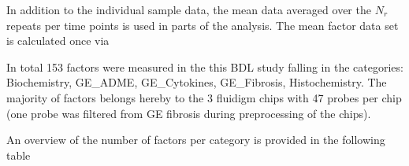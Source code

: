 \documentclass[]{article}
\newenvironment{Shaded}{\begin{snugshade}}{\end{snugshade}}
\newcommand{\KeywordTok}[1]{\textcolor[rgb]{0.13,0.29,0.53}{\textbf{{#1}}}}
\newcommand{\DataTypeTok}[1]{\textcolor[rgb]{0.13,0.29,0.53}{{#1}}}
\newcommand{\StringTok}[1]{\textcolor[rgb]{0.31,0.60,0.02}{{#1}}}
\newcommand{\OtherTok}[1]{\textcolor[rgb]{0.56,0.35,0.01}{{#1}}}
\newcommand{\NormalTok}[1]{{#1}}
\begin{document}
In addition to the individual sample data, the mean data averaged over
the \(N_{r}\) repeats per time points is used in parts of the analysis.
The mean factor data set is calculated once via

\begin{Shaded}
\end{Shaded}

In total 153 factors were measured in the this BDL study falling in the
categories: Biochemistry, GE\_ADME, GE\_Cytokines, GE\_Fibrosis,
Histochemistry. The majority of factors belongs hereby to the 3 fluidigm
chips with 47 probes per chip (one probe was filtered from GE fibrosis
during preprocessing of the chips).

An overview of the number of factors per category is provided in the
following table

\begin{Shaded}
\end{Shaded}
\end{document}
